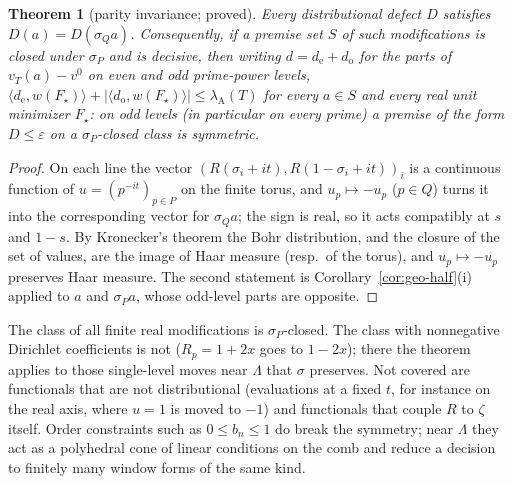 \documentclass[11pt]{amsart}
\newtheorem{theorem}{Theorem}[section]
\theoremstyle{definition}
\theoremstyle{remark}
\newcommand{\lamA}{\lambda_{\mathrm A}(T)}
\begin{document}
\begin{theorem}[parity invariance; proved]\label{thm:geo-parity}
Every distributional defect $D$ satisfies $D(a)=D(\sigma_Qa)$. Consequently, if a premise set $S$ of such modifications is closed under
$\sigma_P$ and is decisive, then writing $d=d_{\mathrm e}+d_{\mathrm o}$ for the parts of $v_T(a)-v^0$ on even and odd prime-power levels,
$\langle d_{\mathrm e},w(F_\star)\rangle+|\langle d_{\mathrm o},w(F_\star)\rangle|\le\lamA$ for every $a\in S$ and every real unit minimizer
$F_\star$: on odd levels (in particular on every prime) a premise of the form $D\le\varepsilon$ on a $\sigma_P$-closed class is symmetric.
\end{theorem}
\begin{proof}
On each line the vector $(R(\sigma_i+it),R(1-\sigma_i+it))_i$ is a continuous function of $u=(p^{-it})_{p\in P}$ on the finite torus, and
$u_p\mapsto-u_p$ ($p\in Q$) turns it into the corresponding vector for $\sigma_Qa$; the sign is real, so it acts compatibly at $s$ and
$1-s$. By Kronecker's theorem the Bohr distribution, and the closure of the set of values, are the image of Haar measure (resp.\ of the
torus), and $u_p\mapsto-u_p$ preserves Haar measure. The second statement is Corollary~\ref{cor:geo-half}(i) applied to $a$ and $\sigma_Pa$,
whose odd-level parts are opposite.
\end{proof}

The class of all finite real modifications is $\sigma_P$-closed. The class with nonnegative Dirichlet coefficients is not
($R_p=1+2x$ goes to $1-2x$); there the theorem applies to those single-level moves near $\Lambda$ that $\sigma$ preserves. Not covered
are functionals that are not distributional (evaluations at a fixed $t$, for instance on the real axis, where $u=1$ is moved to $-1$)
and functionals that couple $R$ to $\zeta$ itself. Order constraints such as $0\le b_n\le1$ do break the symmetry; near $\Lambda$ they act
as a polyhedral cone of linear conditions on the comb and reduce a decision to finitely many window forms of the same kind.
\end{document}
